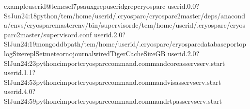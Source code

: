 \documentclass[a4paper,10pt,english]{sphinxmanual}
\begin{document}
\begin{sphinxVerbatim}[commandchars=\\\{\}]
exampleuserid@tem\PYGZhy{}cs\PYGZhy{}el7\PYGZdl{}\PYGZgt{}psauxgrep\PYGZlt{}userid\PYGZgt{}grepcryosparc
userid.0.0?SsJun24:18python/tem/home/userid/.cryosparc/cryosparc2\PYGZus{}master/deps/anaconda/envs/cryosparc\PYGZus{}master\PYGZus{}env/bin/supervisord\PYGZhy{}c/tem/home/userid/.cryosparc/cryosparc2\PYGZus{}master/supervisord.conf
userid.2.0?SlJun24:19mongod\PYGZhy{}\PYGZhy{}dbpath/tem/home/userid/.cryosparc/cryosparc\PYGZus{}database\PYGZhy{}\PYGZhy{}port\PYGZhy{}\PYGZhy{}oplogSize\PYGZhy{}\PYGZhy{}replSetmeteor\PYGZhy{}\PYGZhy{}nojournal\PYGZhy{}\PYGZhy{}wiredTigerCacheSizeGB
userid.2.0?SlJun24:23python\PYGZhy{}cimportcryosparc\PYGZus{}command.command\PYGZus{}coreasservserv.start
userid.1.1?SlJun24:53python\PYGZhy{}cimportcryosparc\PYGZus{}command.command\PYGZus{}visasservserv.start
userid.4.0?SlJun24:59python\PYGZhy{}cimportcryosparc\PYGZus{}command.command\PYGZus{}rtpasservserv.start

\end{sphinxVerbatim}
\end{document}
